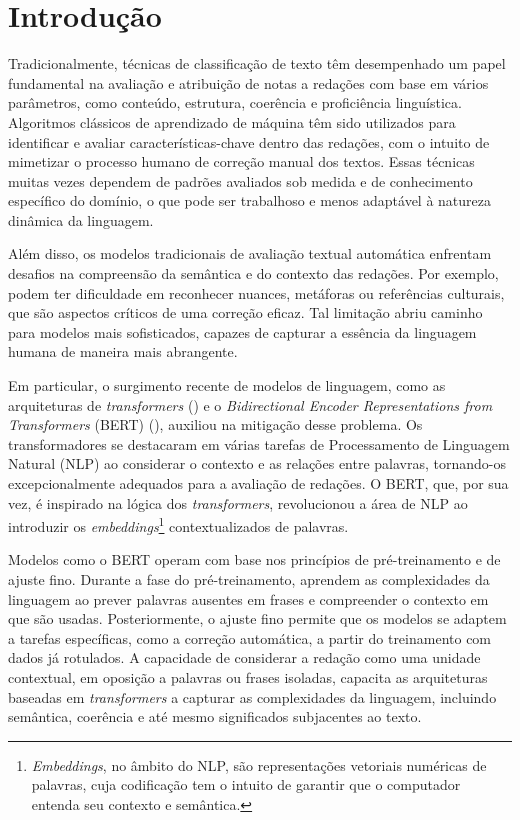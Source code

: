 
\chapter{Introdução}

Tradicionalmente, técnicas de classificação de texto têm desempenhado um papel fundamental na avaliação e atribuição de notas a redações com base em vários parâmetros, como conteúdo, estrutura, coerência e proficiência linguística. Algoritmos clássicos de aprendizado de máquina têm sido utilizados para identificar e avaliar características-chave dentro das redações, com o intuito de mimetizar o processo humano de correção manual dos textos. Essas técnicas muitas vezes dependem de padrões avaliados sob medida e de conhecimento específico do domínio, o que pode ser trabalhoso e menos adaptável à natureza dinâmica da linguagem.

Além disso, os modelos tradicionais de avaliação textual automática enfrentam desafios na compreensão da semântica e do contexto das redações. Por exemplo, podem ter dificuldade em reconhecer nuances, metáforas ou referências culturais, que são aspectos críticos de uma correção eficaz. Tal limitação abriu caminho para modelos mais sofisticados, capazes de capturar a essência da linguagem humana de maneira mais abrangente.

Em particular, o surgimento recente de modelos de linguagem, como as arquiteturas de \textit{transformers} (\cite{attention2017}) e o \textit{Bidirectional Encoder Representations from Transformers} (BERT) (\cite{bert2018}), auxiliou na mitigação desse problema. Os transformadores se destacaram em várias tarefas de Processamento de Linguagem Natural (NLP) ao considerar o contexto e as relações entre palavras, tornando-os excepcionalmente adequados para a avaliação de redações. O BERT, que, por sua vez, é inspirado na lógica dos \textit{transformers}, revolucionou a área de NLP ao introduzir os \textit{embeddings}\footnote{\textit{Embeddings}, no âmbito do NLP, são representações vetoriais numéricas de palavras, cuja codificação tem o intuito de garantir que o computador entenda seu contexto e semântica.} contextualizados de palavras.

Modelos como o BERT operam com base nos princípios de pré-treinamento e de ajuste fino. Durante a fase do pré-treinamento, aprendem as complexidades da linguagem ao prever palavras ausentes em frases e compreender o contexto em que são usadas. Posteriormente, o ajuste fino permite que os modelos se adaptem a tarefas específicas, como a correção automática, a partir do treinamento com dados já rotulados. A capacidade de considerar a redação como uma unidade contextual, em oposição a palavras ou frases isoladas, capacita as arquiteturas baseadas em \textit{transformers} a capturar as complexidades da linguagem, incluindo semântica, coerência e até mesmo significados subjacentes ao texto.

